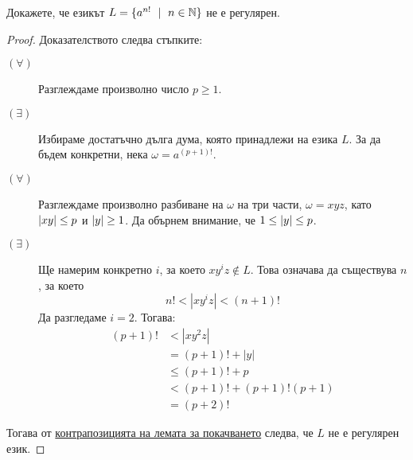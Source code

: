 \begin{extra}
\begin{problem}
  Докажете, че езикът $L = \{a^{n!}\ \mid\ n\in\Nat\}$ не е регулярен.  
\end{problem}
\begin{proof}
  Доказателството следва стъпките:
  \begin{description}
  \item[$(\forall)$]
    Разглеждаме произволно число $p \geq 1$.
  \item[$(\exists)$]
    Избираме достатъчно дълга дума, която принадлежи на езика $L$. 
    За да бъдем конкретни, нека $\omega = a^{(p+1)!}$.
  \item[$(\forall)$]
    Разглеждаме произволно разбиване на $\omega$ на три части, $\omega = xyz$, 
    като $\vert{xy}\vert \leq p$ и $\vert{y}\vert \geq 1$.
    Да обърнем внимание, че $1 \leq \vert{y}\vert \leq p$.
  \item[$(\exists)$]
    Ще намерим конкретно $i$, за което $xy^iz \not\in L$.
    Това означава да съществува $n$, за което
    \[n! < |xy^iz| < (n+1)!\]
    Да разгледаме $i = 2$. Тогава:
    \begin{align*}
      (p+1)! & < |xy^2z| \\
             & = (p+1)! + |y|\\
             & \leq (p+1)! + p \\
             & < (p+1)! + (p+1)!(p+1) \\
             & = (p+2)!
    \end{align*}
  \end{description}
  Тогава от \hyperref[cor:pumping-reg]{контрапозицията на лемата за покачването} следва, че $L$ не е регулярен език.  
\end{proof}


\end{extra}
